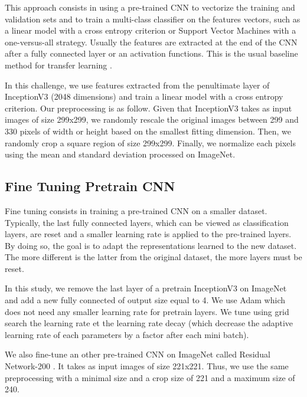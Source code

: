 \documentclass[10pt,twocolumn,letterpaper]{article}
\begin{document}
This approach consists in using a pre-trained CNN to vectorize the training and validation sets and to train a multi-class classifier on the features vectors, such as a linear model with a cross entropy criterion or Support Vector Machines with a one-versus-all strategy.
Usually the features are extracted at the end of the CNN after a fully connected layer or an activation functions. This is the usual baseline method for transfer learning \cite{simonyan2014very}.

In this challenge, we use features extracted from the penultimate layer of InceptionV3 \cite{szegedy2015rethinking} (2048 dimensions) and train a linear model with a cross entropy criterion. Our preprocessing is as follow. Given that InceptionV3 takes as input images of size 299x299, we randomly rescale the original images between 299 and 330 pixels of width or height based on the smallest fitting dimension. Then, we randomly crop a square region of size 299x299. Finally, we normalize each pixels using the mean and standard deviation processed on ImageNet.


\subsection{Fine Tuning Pretrain CNN}

Fine tuning consists in training a pre-trained CNN on a smaller dataset. Typically, the last fully connected layers, which can be viewed as classification layers, are reset and a smaller learning rate is applied to the pre-trained layers. By doing so, the goal is to adapt the representations learned to the new dataset. The more different is the latter from the original dataset, the more layers must be reset.

In this study, we remove the last layer of a pretrain InceptionV3 on ImageNet and add a new fully connected of output size equal to 4. We use Adam \cite{Kingma14} which does not need any smaller learning rate for pretrain layers. We tune using grid search the learning rate et the learning rate decay (which decrease the adaptive learning rate of each parameters by a factor after each mini batch).

We also fine-tune an other pre-trained CNN on ImageNet called Residual Network-200 \cite{he2016deep}. It takes as input images of size 221x221. Thus, we use the same preprocessing with a minimal size and a crop size of 221 and a maximum size of 240.
\end{document}
